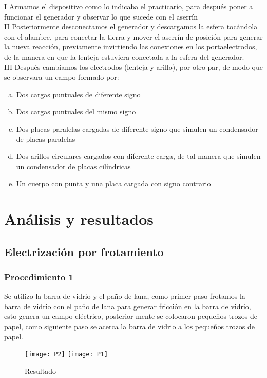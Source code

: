 \documentclass[spanish,10pt,a4paper,onecolumn]{article}
\begin{document}
I Armamos el dispositivo como lo indicaba el practicarío, para después poner a funcionar el generador y observar lo que sucede con el aserrín \\


II Posteriormente desconectamos el generador y descargamos la esfera tocándola con el alambre, para conectar la tierra y mover el aserrín de posición para generar la nueva reacción, previamente invirtiendo las conexiones en los portaelectrodos, de la manera en que la lenteja estuviera conectada a la esfera del generador. \\


III Después cambiamos los electrodos (lenteja y arillo), por otro par, de modo que se observara un campo formado por: 

\begin{enumerate}[a)]
	\item Dos cargas puntuales de diferente signo 
	\item Dos cargas puntuales del mismo signo 
	\item Dos placas paralelas cargadas de diferente signo que simulen un condensador de placas paralelas 
	\item Dos arillos circulares cargados con diferente carga, de tal manera que simulen un condensador de placas cilíndricas 
	\item Un cuerpo con punta y una placa cargada con signo contrario 
	
\end{enumerate}

\section{Análisis y resultados}
\subsection{Electrización por frotamiento}
\subsubsection{Procedimiento 1}
Se utilizo la barra de vidrio y el paño de lana, como primer paso frotamos la barra de vidrio con el paño de lana para generar fricción en la barra de vidrio, esto genera un campo eléctrico, posterior mente se colocaron pequeños trozos de papel, como siguiente paso se acerca la barra de vidrio a los pequeños trozos de papel.

\begin{figure}[h]
	\centering
	\texttt{[image: P2]}
	\texttt{[image: P1]}
	\caption{Resultado}
\end{figure}
\end{document}
